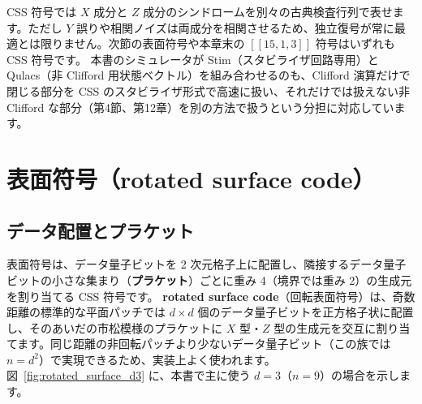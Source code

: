 CSS 符号では $X$ 成分と $Z$ 成分のシンドロームを別々の古典検査行列で表せます。ただし $Y$ 誤りや相関ノイズは両成分を相関させるため、独立復号が常に最適とは限りません。次節の表面符号や本章末の $[[15,1,3]]$ 符号はいずれも CSS 符号です。
本書のシミュレータが Stim（スタビライザ回路専用）と Qulacs（非 Clifford 用状態ベクトル）を組み合わせるのも、Clifford 演算だけで閉じる部分を CSS のスタビライザ形式で高速に扱い、それだけでは扱えない非 Clifford な部分（第4節、第12章）を別の方法で扱うという分担に対応しています。

\section{表面符号（rotated surface code）}\label{sec:surface_code}

\subsection{データ配置とプラケット}

表面符号は、データ量子ビットを 2 次元格子上に配置し、隣接するデータ量子ビットの小さな集まり（\textbf{プラケット}）ごとに重み 4（境界では重み 2）の生成元を割り当てる CSS 符号です。
\textbf{rotated surface code}（回転表面符号）は、奇数距離の標準的な平面パッチでは $d \times d$ 個のデータ量子ビットを正方格子状に配置し、そのあいだの市松模様のプラケットに $X$ 型・$Z$ 型の生成元を交互に割り当てます。同じ距離の非回転パッチより少ないデータ量子ビット（この族では $n=d^2$）で実現できるため、実装上よく使われます\cite{fowler2012surface,dennis2002topological}。
図~\ref{fig:rotated_surface_d3} に、本書で主に使う $d=3$（$n=9$）の場合を示します。


